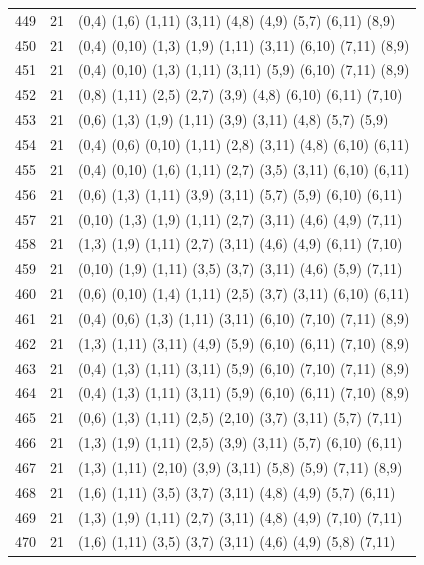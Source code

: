 \begin{appendix}
{\begin{longtable}{lll}
449& 21 & (0,4)   (1,6)  (1,11) (3,11)  (4,8)   (4,9)   (5,7)   (6,11)  (8,9)\\
450& 21 & (0,4)   (0,10) (1,3)  (1,9)   (1,11)  (3,11)  (6,10)  (7,11)  (8,9)\\
451& 21 & (0,4)   (0,10) (1,3)  (1,11)  (3,11)  (5,9)   (6,10)  (7,11)  (8,9)\\
452& 21 & (0,8)   (1,11) (2,5)  (2,7)   (3,9)   (4,8)   (6,10)  (6,11)  (7,10)\\
453& 21 & (0,6)   (1,3)  (1,9)  (1,11)  (3,9)   (3,11)  (4,8)   (5,7)   (5,9)\\
454& 21 & (0,4)   (0,6)  (0,10) (1,11)  (2,8)   (3,11)  (4,8)   (6,10)  (6,11)\\
455& 21 & (0,4)   (0,10) (1,6)  (1,11)  (2,7)   (3,5)   (3,11)  (6,10)  (6,11)\\
456& 21 & (0,6)   (1,3)  (1,11) (3,9)   (3,11)  (5,7)   (5,9)   (6,10)  (6,11)\\
457& 21 & (0,10)  (1,3)  (1,9)  (1,11)  (2,7)   (3,11)  (4,6)   (4,9)   (7,11)\\
458& 21 & (1,3)   (1,9)  (1,11) (2,7)   (3,11)  (4,6)   (4,9)   (6,11)  (7,10)\\
459& 21 & (0,10)  (1,9)  (1,11) (3,5)   (3,7)   (3,11)  (4,6)   (5,9)   (7,11)\\
460& 21 & (0,6)   (0,10) (1,4)  (1,11)  (2,5)   (3,7)   (3,11)  (6,10)  (6,11)\\
461& 21 & (0,4)   (0,6)  (1,3)  (1,11)  (3,11)  (6,10)  (7,10)  (7,11)  (8,9)\\
462& 21 & (1,3)   (1,11) (3,11) (4,9)   (5,9)   (6,10)  (6,11)  (7,10)  (8,9)\\
463& 21 & (0,4)   (1,3)  (1,11) (3,11)  (5,9)   (6,10)  (7,10)  (7,11)  (8,9)\\
464& 21 & (0,4)   (1,3)  (1,11) (3,11)  (5,9)   (6,10)  (6,11)  (7,10)  (8,9)\\
465& 21 & (0,6)   (1,3)  (1,11) (2,5)   (2,10)  (3,7)   (3,11)  (5,7)   (7,11)\\
466& 21 & (1,3)   (1,9)  (1,11) (2,5)   (3,9)   (3,11)  (5,7)   (6,10)  (6,11)\\
467& 21 & (1,3)   (1,11) (2,10) (3,9)   (3,11)  (5,8)   (5,9)   (7,11)  (8,9)\\
468& 21 & (1,6)   (1,11) (3,5)  (3,7)   (3,11)  (4,8)   (4,9)   (5,7)   (6,11)\\
469& 21 & (1,3)   (1,9)  (1,11) (2,7)   (3,11)  (4,8)   (4,9)   (7,10)  (7,11)\\
470& 21 & (1,6)   (1,11) (3,5)  (3,7)   (3,11)  (4,6)   (4,9)   (5,8)   (7,11)\\

\end{longtable}}
\end{appendix}
